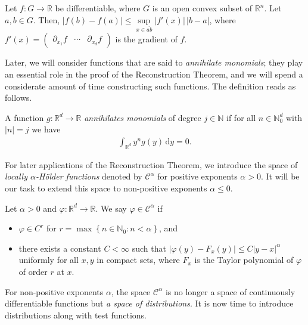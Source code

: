 \begin{theorem}\label{mean-value-inequality}
    Let \(f: G \to \mathbb{R}\) be differentiable, where \(G\) is an open convex subset of \(\mathbb{R}^n\). Let \(a,b \in G\). Then, \(|f(b) - f(a)| \leq \sup\limits_{x \in \overline{ab}} |f'(x)| \, |b-a|\), where 
    \(
        f'(x) = 
        \begin{pmatrix}
            \partial_{x_1}f & \cdots & \partial_{x_d}f
        \end{pmatrix}
    \)
    is the gradient of \(f\). 
\end{theorem}

Later, we will consider functions that are said to \emph{annihilate monomials}; they play an essential role in the proof of the Reconstruction Theorem, and we will spend a considerate amount of time constructing such functions. The definition reads as follows.

\begin{definition}
    A function \(g: \mathbb{R}^d \to \mathbb{R}\) \emph{annihilates monomials} of degree \(j \in \mathbb{N}\) if for all \(n \in \mathbb{N}^d_0\) with \(|n| = j\) we have
    \begin{align*}
        \int_{\mathbb{R}^d} y^n g (y) \, \mathrm{d}y = 0.
    \end{align*}
\end{definition}

For later applications of the Reconstruction Theorem, we introduce the space of \emph{locally \({\alpha}\)-Hölder functions} denoted by \(\mathcal{C}^{\alpha}\) for positive exponents \(\alpha > 0\). It will be our task to extend this space to non-positive exponents \({\alpha \leq 0}\). 

\begin{definition}\label{definition:hoelder-functions}
    Let \(\alpha > 0\) and \(\varphi: \mathbb{R}^d \to \mathbb{R}\). We say \(\varphi \in \mathcal{C}^{\alpha}\) if
\begin{itemize}
    \item \(\varphi \in C^r\) for \(r = \max \left \{ n \in \mathbb{N}_0 : n < \alpha \right \} \), and
    \item there exists a constant \(C < {\infty}\) such that \(|\varphi(y) - F_x(y)| \leq C |y-x|^{\alpha}\) uniformly for all \(x,y\) in compact sets, where \(F_x\) is the Taylor polynomial of \({\varphi}\) of order \(r\) at \(x\).   
\end{itemize}
\end{definition}
For non-positive exponents \( \alpha \), the space \( \mathcal{C}^\alpha \) is no longer a space of continuously differentiable functions but \emph{a space of distributions}. It is now time to introduce distributions along with test functions.


